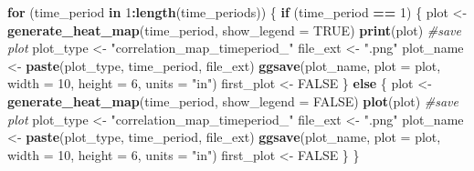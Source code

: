 \documentclass[
]{article}
\newenvironment{Shaded}{\begin{snugshade}}{\end{snugshade}}
\newcommand{\AttributeTok}[1]{\textcolor[rgb]{0.13,0.29,0.53}{#1}}
\newcommand{\CommentTok}[1]{\textcolor[rgb]{0.56,0.35,0.01}{\textit{#1}}}
\newcommand{\ConstantTok}[1]{\textcolor[rgb]{0.56,0.35,0.01}{#1}}
\newcommand{\ControlFlowTok}[1]{\textcolor[rgb]{0.13,0.29,0.53}{\textbf{#1}}}
\newcommand{\DecValTok}[1]{\textcolor[rgb]{0.00,0.00,0.81}{#1}}
\newcommand{\FunctionTok}[1]{\textcolor[rgb]{0.13,0.29,0.53}{\textbf{#1}}}
\newcommand{\NormalTok}[1]{#1}
\newcommand{\OtherTok}[1]{\textcolor[rgb]{0.56,0.35,0.01}{#1}}
\newcommand{\SpecialCharTok}[1]{\textcolor[rgb]{0.81,0.36,0.00}{\textbf{#1}}}
\newcommand{\StringTok}[1]{\textcolor[rgb]{0.31,0.60,0.02}{#1}}
\begin{document}
\begin{Shaded}
\begin{Highlighting}[]
\ControlFlowTok{for}\NormalTok{ (time\_period }\ControlFlowTok{in} \DecValTok{1}\SpecialCharTok{:}\FunctionTok{length}\NormalTok{(time\_periods)) \{}
  \ControlFlowTok{if}\NormalTok{ (time\_period }\SpecialCharTok{==} \DecValTok{1}\NormalTok{) \{}
\NormalTok{    plot }\OtherTok{\textless{}{-}} \FunctionTok{generate\_heat\_map}\NormalTok{(time\_period, }\AttributeTok{show\_legend =} \ConstantTok{TRUE}\NormalTok{)}
    \FunctionTok{print}\NormalTok{(plot)}
    \CommentTok{\#save plot}
\NormalTok{    plot\_type }\OtherTok{\textless{}{-}} \StringTok{"correlation\_map\_timeperiod\_"}
\NormalTok{    file\_ext }\OtherTok{\textless{}{-}} \StringTok{".png"}
\NormalTok{    plot\_name }\OtherTok{\textless{}{-}} \FunctionTok{paste}\NormalTok{(plot\_type, time\_period, file\_ext)}
    \FunctionTok{ggsave}\NormalTok{(plot\_name, }\AttributeTok{plot =}\NormalTok{ plot, }\AttributeTok{width =} \DecValTok{10}\NormalTok{, }\AttributeTok{height =} \DecValTok{6}\NormalTok{, }\AttributeTok{units =} \StringTok{"in"}\NormalTok{)}
\NormalTok{    first\_plot }\OtherTok{\textless{}{-}} \ConstantTok{FALSE}
\NormalTok{  \} }\ControlFlowTok{else}\NormalTok{ \{}
\NormalTok{    plot }\OtherTok{\textless{}{-}} \FunctionTok{generate\_heat\_map}\NormalTok{(time\_period, }\AttributeTok{show\_legend =} \ConstantTok{FALSE}\NormalTok{)}
    \FunctionTok{plot}\NormalTok{(plot)}
    \CommentTok{\#save plot}
\NormalTok{    plot\_type }\OtherTok{\textless{}{-}} \StringTok{"correlation\_map\_timeperiod\_"}
\NormalTok{    file\_ext }\OtherTok{\textless{}{-}} \StringTok{".png"}
\NormalTok{    plot\_name }\OtherTok{\textless{}{-}} \FunctionTok{paste}\NormalTok{(plot\_type, time\_period, file\_ext)}
    \FunctionTok{ggsave}\NormalTok{(plot\_name, }\AttributeTok{plot =}\NormalTok{ plot, }\AttributeTok{width =} \DecValTok{10}\NormalTok{, }\AttributeTok{height =} \DecValTok{6}\NormalTok{, }\AttributeTok{units =} \StringTok{"in"}\NormalTok{)}
\NormalTok{    first\_plot }\OtherTok{\textless{}{-}} \ConstantTok{FALSE}
\NormalTok{  \}}
\NormalTok{\}}
\end{Highlighting}
\end{Shaded}
\end{document}
